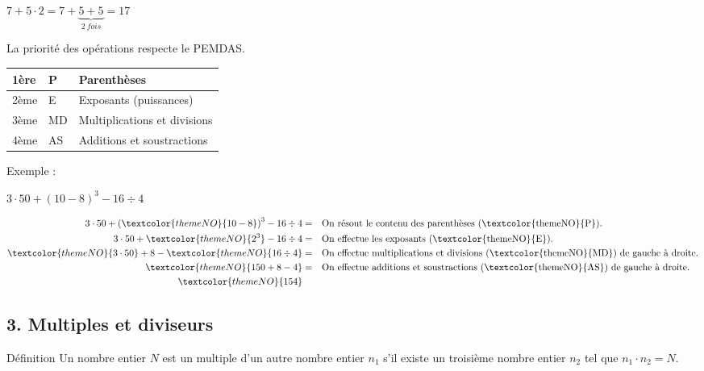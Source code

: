\begin{center}
$7+5\cdot 2=7+\underset{2\ fois}{\underbrace{5+5}}=17$
\end{center}

La priorité des opérations respecte le \textcolor{themeNO}{PEMDAS}.

\def\arraystretch{1.6}
\begin{tabularx}{\linewidth}{|p{2cm}|>{\centering\arraybackslash}p{2cm}|X|}
\hline
1ère & \textcolor{themeNO}{P} & Parenthèses\\\hline
2ème & \textcolor{themeNO}{E} & Exposants (puissances)\\\hline
3ème & \textcolor{themeNO}{MD} & Multiplications et divisions\\\hline
4ème & \textcolor{themeNO}{AS} & Additions et soustractions\\\hline
\end{tabularx}
\def\arraystretch{1}

\newpage
Exemple :

\vspace{-10pt}\begin{center}$3\cdot 50+\left(10-8\right)^3-16\div4$\end{center}

\vspace{-30pt}\begin{align*}
3\cdot 50+\left(\textcolor{themeNO}{10-8}\right)^3-16\div4&=&&\text{On résout le contenu des parenthèses (\textcolor{themeNO}{P}).}\\
3\cdot 50+\textcolor{themeNO}{2^3}-16\div4&=   &&\text{On effectue les exposants (\textcolor{themeNO}{E}).}\\
\textcolor{themeNO}{3\cdot 50}+8-\textcolor{themeNO}{16\div4}&=&&\text{On effectue multiplications et divisions (\textcolor{themeNO}{MD}) de gauche à droite.}\\
\textcolor{themeNO}{150+8-4}&=&&\text{On effectue additions et soustractions (\textcolor{themeNO}{AS}) de gauche à droite.}\\
\textcolor{themeNO}{154}&&&
\end{align*}

\vfill
\subsection*{3. Multiples et diviseurs}

\begin{regle}{Définition}
Un nombre entier $N$ est un \textcolor{themeNO}{multiple} d'un autre nombre entier $n_1$ s'il existe un troisième nombre entier $n_2$ tel que $n_1\cdot n_2=N$.
\end{regle}


